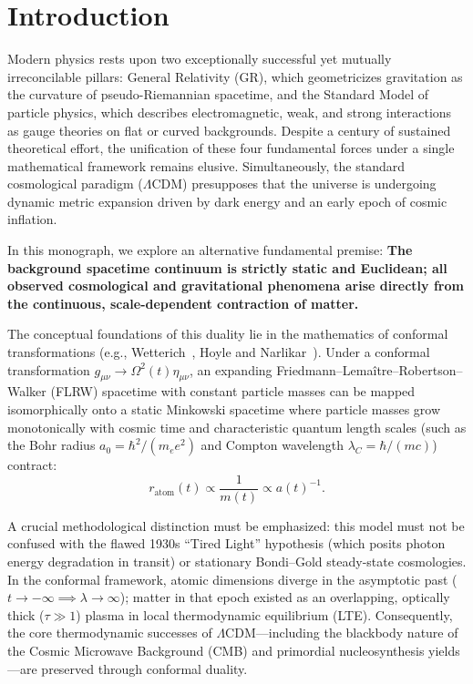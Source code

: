 \section{Introduction}
\label{sec:giris}

Modern physics rests upon two exceptionally successful yet mutually irreconcilable pillars: General Relativity (GR), which geometricizes gravitation as the curvature of pseudo-Riemannian spacetime, and the Standard Model of particle physics, which describes electromagnetic, weak, and strong interactions as gauge theories on flat or curved backgrounds. Despite a century of sustained theoretical effort, the unification of these four fundamental forces under a single mathematical framework remains elusive. Simultaneously, the standard cosmological paradigm ($\Lambda$CDM) presupposes that the universe is undergoing dynamic metric expansion driven by dark energy and an early epoch of cosmic inflation.

In this monograph, we explore an alternative fundamental premise: \textbf{The background spacetime continuum is strictly static and Euclidean; all observed cosmological and gravitational phenomena arise directly from the continuous, scale-dependent contraction of matter.}

The conceptual foundations of this duality lie in the mathematics of conformal transformations (e.g., Wetterich~\cite{wetterich2013}, Hoyle and Narlikar~\cite{hoyle1964}). Under a conformal transformation $g_{\mu\nu} \to \Omega^2(t) \eta_{\mu\nu}$, an expanding Friedmann--Lema\^itre--Robertson--Walker (FLRW) spacetime with constant particle masses can be mapped isomorphically onto a static Minkowski spacetime where particle masses grow monotonically with cosmic time and characteristic quantum length scales (such as the Bohr radius $a_0 = \hbar^2/(m_e e^2)$ and Compton wavelength $\lambda_C = \hbar/(mc)$) contract:
\begin{equation}
      r_{\mathrm{atom}}(t) \propto \frac{1}{m(t)} \propto a(t)^{-1}.
      \label{eq:konformal_olcekleme}
\end{equation}

A crucial methodological distinction must be emphasized: this model must not be confused with the flawed 1930s ``Tired Light'' hypothesis (which posits photon energy degradation in transit) or stationary Bondi--Gold steady-state cosmologies. In the conformal framework, atomic dimensions diverge in the asymptotic past ($t \to -\infty \implies \lambda \to \infty$); matter in that epoch existed as an overlapping, optically thick ($\tau \gg 1$) plasma in local thermodynamic equilibrium (LTE). Consequently, the core thermodynamic successes of $\Lambda$CDM---including the blackbody nature of the Cosmic Microwave Background (CMB) and primordial nucleosynthesis yields---are preserved through conformal duality.

